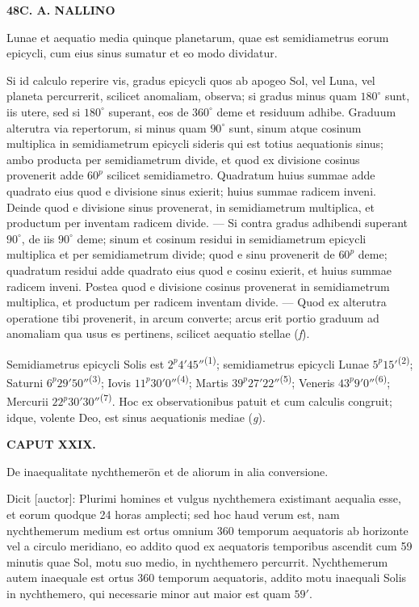 \documentclass[10pt]{article}
\newcommand{\A}[1]{\hypertarget{#1}{}}
\newcommand{\NM}[1]{\textsuperscript{(#1)}}
\newcommand{\SP}[3]{%
  \clearpage
  \A{AB01-PDF#1}%
  \begin{center}\textbf{#2\quad #3}\end{center}%
}
\begin{document}
\SP{0137}{48}{C. A. NALLINO}

\A{AB01-PDF0137-P01}
Lunae et aequatio media quinque planetarum, quae est
semidiametrus eorum epicycli, cum eius sinus sumatur et eo
modo dividatur.

\A{AB01-PDF0137-P02}
Si id calculo reperire vis, gradus epicycli quos ab apogeo
Sol, vel Luna, vel planeta percurrerit, scilicet anomaliam,
observa; si gradus minus quam $180^\circ$ sunt, iis utere,
sed si $180^\circ$ superant, eos de $360^\circ$ deme et
residuum adhibe. Graduum alterutra via repertorum, si minus
quam $90^\circ$ sunt, sinum atque cosinum multiplica in
semidiametrum epicycli sideris qui est totius aequationis
sinus; ambo producta per semidiametrum divide, et quod ex
divisione cosinus provenerit adde $60^{p}$ scilicet
semidiametro. Quadratum huius summae adde quadrato eius
quod e divisione sinus exierit; huius summae radicem inveni.
Deinde quod e divisione sinus provenerat, in semidiametrum
multiplica, et productum per inventam radicem divide.
— Si contra gradus adhibendi superant $90^\circ$, de iis
$90^\circ$ deme; sinum et cosinum residui in semidiametrum
epicycli multiplica et per semidiametrum divide; quod e
sinu provenerit de $60^{p}$ deme; quadratum residui adde
quadrato eius quod e cosinu exierit, et huius summae
radicem inveni. Postea quod e divisione cosinus provenerat
in semidiametrum multiplica, et productum per radicem
inventam divide. — Quod ex alterutra operatione tibi
provenerit, in arcum converte; arcus erit portio graduum
ad anomaliam qua usus es pertinens, scilicet aequatio
stellae ({\itshape f}).

\A{AB01-PDF0137-P03}
Semidiametrus epicycli Solis est $2^{p}4'45''$\NM{1};
semidiametrus epicycli Lunae $5^{p}15'$\NM{2};
Saturni $6^{p}29'50''$\NM{3}; Iovis $11^{p}30'0''$\NM{4};
Martis $39^{p}27'22''$\NM{5}; Veneris $43^{p}9'0''$\NM{6};
Mercurii $22^{p}30'30''$\NM{7}.
Hoc ex observationibus patuit et cum calculis congruit;
idque, volente Deo, est sinus aequationis mediae ({\itshape g}).

\A{AB01-PDF0137-H01}
\begin{center}
\textbf{CAPUT XXIX.}\par
De inaequalitate nychthemerōn et de aliorum in alia conversione.
\end{center}

\A{AB01-PDF0137-P04}
Dicit [auctor]: Plurimi homines et vulgus nychthemera
existimant aequalia esse, et eorum quodque 24 horas amplecti;
sed hoc haud verum est, nam nychthemerum medium est ortus
omnium 360 temporum aequatoris ab horizonte vel a circulo
meridiano, eo addito quod ex aequatoris temporibus ascendit
cum 59 minutis quae Sol, motu suo medio, in nychthemero
percurrit. Nychthemerum autem inaequale est ortus 360
temporum aequatoris, addito motu inaequali Solis in
nychthemero, qui necessarie minor aut maior est quam $59'$.
\end{document}
